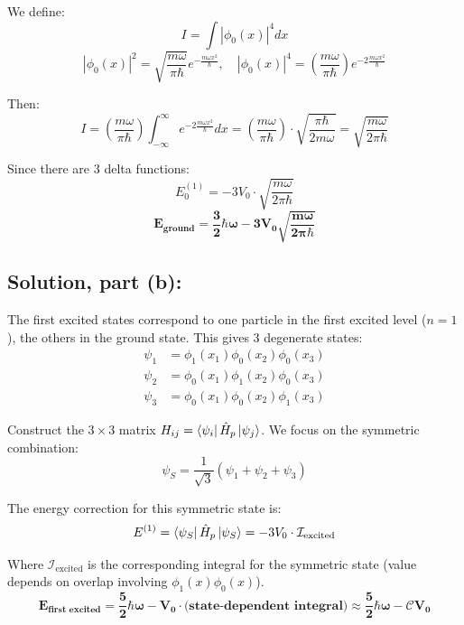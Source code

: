 \documentclass[12pt]{article}
\begin{document}
        We define:
        \[
            I = \int |\phi_0(x)|^4 dx
        \]
        \[
            |\phi_0(x)|^2 = \sqrt{ \frac{m\omega}{\pi\hbar} } e^{- \frac{m\omega x^2}{\hbar} }, \quad
            |\phi_0(x)|^4 = \left( \frac{m\omega}{\pi\hbar} \right) e^{-2 \frac{m\omega x^2}{\hbar} }
        \]
        
        Then:
        \[
            I = \left( \frac{m\omega}{\pi\hbar} \right) \int_{-\infty}^{\infty} e^{-2 \frac{m\omega x^2}{\hbar}} dx
            = \left( \frac{m\omega}{\pi\hbar} \right) \cdot \sqrt{ \frac{\pi \hbar}{2m\omega} } 
            = \sqrt{ \frac{m\omega}{2\pi\hbar} }
        \]
        
        Since there are 3 delta functions:
        \[
            E_0^{(1)} = -3 V_0 \cdot \sqrt{ \frac{m\omega}{2\pi\hbar} }
        \]
        \[
            \boldsymbol{\boxed{E_{\text{ground}} = \frac{3}{2} \hbar \omega - 3 V_0 \sqrt{ \frac{m\omega}{2\pi\hbar}}}}
        \]

    \subsection{Solution, part (b):}
        The first excited states correspond to one particle in the first excited level (\( n = 1 \)), the others in the ground state. This gives 3 degenerate states:
        \[
            \begin{aligned}
                \psi_1 &= \phi_1(x_1) \phi_0(x_2) \phi_0(x_3) \\
                \psi_2 &= \phi_0(x_1) \phi_1(x_2) \phi_0(x_3) \\
                \psi_3 &= \phi_0(x_1) \phi_0(x_2) \phi_1(x_3)
            \end{aligned}
        \]
        
        Construct the \( 3 \times 3 \) matrix \( H_{ij} = \bra{\psi_i} \hat{H}_p \ket{\psi_j} \). We focus on the symmetric combination:
        \[
            \psi_S = \frac{1}{\sqrt{3}} (\psi_1 + \psi_2 + \psi_3)
        \]
        
        The energy correction for this symmetric state is:
        \[
            E^{(1)} = \bra{\psi_S} \hat{H}_p \ket{\psi_S} = -3 V_0 \cdot \mathcal{I}_{\text{excited}}
        \]
        
        Where \( \mathcal{I}_{\text{excited}} \) is the corresponding integral for the symmetric state (value depends on overlap involving \( \phi_1(x) \phi_0(x) \)).
        \[
            \boldsymbol{\boxed{
            E_{\text{first excited}} = \frac{5}{2} \hbar \omega - V_0 \cdot \text{(state-dependent integral)} \approx \frac{5}{2} \hbar \omega - \mathcal{C} V_0
            }}
        \]
\end{document}
